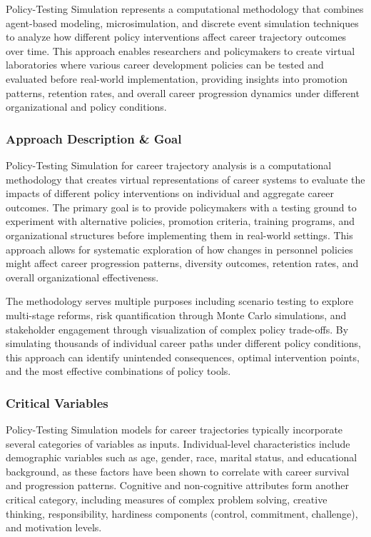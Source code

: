 \documentclass[main.tex]{subfiles}
\begin{document}
Policy-Testing Simulation represents a computational methodology that combines agent-based modeling, microsimulation, and discrete event simulation techniques to analyze how different policy interventions affect career trajectory outcomes over time. This approach enables researchers and policymakers to create virtual laboratories where various career development policies can be tested and evaluated before real-world implementation, providing insights into promotion patterns, retention rates, and overall career progression dynamics under different organizational and policy conditions\autocite{gilbert2018, furtado2023}.

\subsubsection{Approach Description \& Goal}

Policy-Testing Simulation for career trajectory analysis is a computational methodology that creates virtual representations of career systems to evaluate the impacts of different policy interventions on individual and aggregate career outcomes\autocite{gilbert2018, furtado2023}. The primary goal is to provide policymakers with a testing ground to experiment with alternative policies, promotion criteria, training programs, and organizational structures before implementing them in real-world settings\autocite{number-analytics1}. This approach allows for systematic exploration of how changes in personnel policies might affect career progression patterns, diversity outcomes, retention rates, and overall organizational effectiveness\autocite{bullinaria2018, wilensky2023}.

The methodology serves multiple purposes including scenario testing to explore multi-stage reforms, risk quantification through Monte Carlo simulations, and stakeholder engagement through visualization of complex policy trade-offs\autocite{number-analytics1}. By simulating thousands of individual career paths under different policy conditions, this approach can identify unintended consequences, optimal intervention points, and the most effective combinations of policy tools\autocite{gilbert2018, career-model}.

\subsubsection{Critical Variables}

Policy-Testing Simulation models for career trajectories typically incorporate several categories of variables as inputs. Individual-level characteristics include demographic variables such as age, gender, race, marital status, and educational background, as these factors have been shown to correlate with career survival and progression patterns\autocite{potential-indicators, bullinaria2018}. Cognitive and non-cognitive attributes form another critical category, including measures of complex problem solving, creative thinking, responsibility, hardiness components (control, commitment, challenge), and motivation levels\autocite{potential-indicators}.
\end{document}
